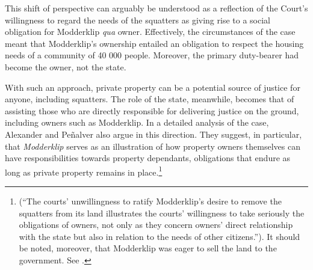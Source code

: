 This shift of perspective can arguably be understood as a reflection of the Court's willingness to regard the needs of the squatters as giving rise to a social obligation for Modderklip {\it qua} owner. Effectively, the circumstances of the case meant that Modderklip's ownership entailed an obligation to respect the housing needs of a community of 40 000 people. Moreover, the primary duty-bearer had become the owner, not the state.

With such an approach, private property can be a potential source of justice for anyone, including squatters. The role of the state, meanwhile, becomes that of assisting those who are directly responsible for delivering justice on the ground, including owners such as Modderklip. In a detailed analysis of the case, Alexander and Pe\~{n}alver also argue in this direction. They suggest, in particular, that {\it Modderklip} serves as an illustration of how property owners themselves can have responsibilities towards property dependants, obligations that endure as long as private property remains in place.\footnote{\cite[157]{alexander09d} (``The courts' unwillingness to ratify Modderklip's desire to remove the squatters from its land illustrates the courts' willingness to take seriously the obligations of owners, not only as they concern owners' direct relationship with the state but also in relation to the needs of other citizens.''). It should be noted, moreover, that Modderklip was eager to sell the land to the government. See \cite[61]{modderklip05}.} 

